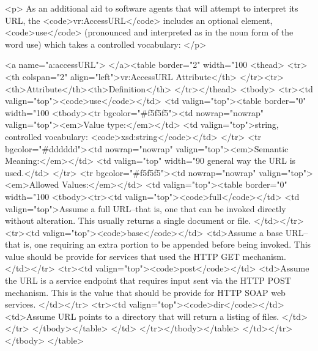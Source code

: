 \documentclass[11pt,a4paper]{ivoa}
\begin{document}
<p>
As an additional aid to software agents that will attempt to interpret
its URL, the <code>vr:AccessURL</code> includes an optional element,
<code>use</code> (pronounced and interpreted as in the noun form of
the word use) which takes a controlled vocabulary:
</p>

<a name="a:accessURL">
</a><table border="2" width="100%
<thead>
  <tr><th colspan="2" align="left">vr:AccessURL Attribute</th>
  </tr><tr><th>Attribute</th><th>Definition</th>
</tr></thead>
<tbody>
  <tr><td valign="top"><code>use</code></td>
      <td valign="top"><table border="0" width="100%
          <tbody><tr bgcolor="#f5f5f5"><td nowrap="nowrap" valign="top"><em>Value type:</em></td>
              <td valign="top">string, controlled vocabulary:
                               <code>xsd:string</code></td>
          </tr>
          <tr bgcolor="#dddddd"><td nowrap="nowrap" valign="top"><em>Semantic Meaning:</em></td>
              <td valign="top" width="90%
general way the URL is used.</td> 
          </tr>
          <tr bgcolor="#f5f5f5"><td nowrap="nowrap" valign="top"><em>Allowed Values:</em></td>
              <td valign="top"><table border="0" width="100%
                 <tbody><tr><td valign="top"><code>full</code></td>
                     <td valign="top">Assume a full URL--that is, one
                     that can be invoked directly without alteration.
                     This usually returns a single document or file. </td></tr>
                 <tr><td valign="top"><code>base</code></td>
                     <td>Assume a base URL--that is, one requiring an
                     extra portion to be appended before being invoked.  
                     This value should be provide for services that
                     used the HTTP GET mechanism.  
                         </td></tr>
                 <tr><td valign="top"><code>post</code></td>
                     <td>Assume the URL is a service endpoint that
                     requires input sent via the HTTP POST mechanism.
                     This is the value that should be provide for HTTP
                     SOAP web services.  
                          </td></tr>
                 <tr><td valign="top"><code>dir</code></td>
                     <td>Assume URL points to a directory that will return a 
                     listing of files.  
                          </td></tr>
              </tbody></table>
              </td> 
          </tr></tbody></table>
      </td></tr>
</tbody>
</table>
\end{document}
